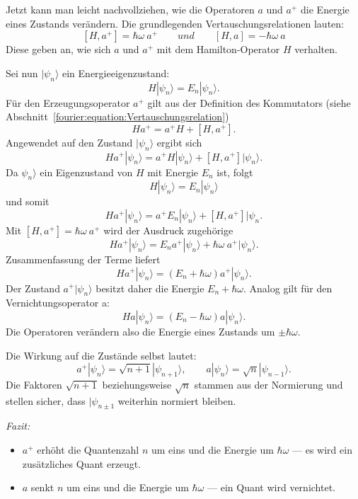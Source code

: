 			Jetzt kann man leicht nachvollziehen, wie die Operatoren $a$ und $a^+$ die Energie eines Zustands verändern.
			Die grundlegenden Vertauschungsrelationen lauten:
			\[
				[H, a^+] = \hbar\omega~a^+
				\qquad
				und
				\qquad
				[H, a] = -\hbar\omega~a
			\]
			Diese geben an, wie sich $a$ und $a^+$ mit dem Hamilton-Operator $H$ verhalten.

			Sei nun $|\psi_n\rangle$ ein Energieeigenzustand:
			\[
				H|\psi_n\rangle = E_n|\psi_n\rangle.
			\]
			Für den Erzeugungsoperator $a^+$ gilt aus der Definition des Kommutators (siehe Abschnitt~\ref{fourier:equation:Vertauschungsrelation})
			\[
				H a^+ = a^+ H + [H, a^+].
			\]
			Angewendet auf den Zustand $|\psi_n\rangle$ ergibt sich
			\[
				H a^+|\psi_n\rangle = a^+ H|\psi_n\rangle + [H, a^+]|\psi_n\rangle.
			\]
			Da $\psi_n\rangle$ ein Eigenzustand von $H$ mit Energie $E_n$ ist, folgt
			\[
				H|\psi_n\rangle = E_n|\psi_n\rangle
			\]
			und somit
			\[
				H a^+|\psi_n\rangle = a^+ E_n|\psi_n\rangle + [H, a^+]|\psi_n.
			\]
			Mit $[H, a^+] = \hbar\omega~a^+$ wird der Ausdruck zugehörige
			\[
				H a^+|\psi_n\rangle = E_n a^+|\psi_n\rangle + \hbar\omega~a^+|\psi_n\rangle.
			\]
			Zusammenfassung der Terme liefert
			\begin{equation}
				H a^+|\psi_n\rangle = (E_n + \hbar\omega)a^+|\psi_n\rangle.
			\end{equation}
			Der Zustand $a^+|\psi_n\rangle$ besitzt daher die Energie $E_n + \hbar\omega$.
			Analog gilt für den Vernichtungsoperator a:
			\begin{equation}
				H a |\psi_n\rangle = (E_n - \hbar\omega)a|\psi_n\rangle.
			\end{equation}
			Die Operatoren verändern also die Energie eines Zustands um $\pm\hbar\omega$.

			Die Wirkung auf die Zustände selbst lautet:
			\begin{equation}
				a^+|\psi_n\rangle = \sqrt{n+1}|\psi_{n+1}\rangle, \qquad a|\psi_n\rangle = \sqrt{n}|\psi_{n-1}\rangle.
			\end{equation}
			Die Faktoren $\sqrt{n+1}$ beziehungsweise $\sqrt{n}$ stammen aus der Normierung und stellen sicher, dass $|\psi_{n\pm 1}$ weiterhin normiert bleiben.

			\emph{Fazit:}
			\begin{itemize}
				\item $a^+$ erhöht die Quantenzahl $n$ um eins und die Energie um $\hbar\omega$ ---
				es wird ein zusätzliches Quant erzeugt.
				\item $a$ senkt $n$ um eins und die Energie um $\hbar\omega$ ---
				ein Quant wird vernichtet.
			\end{itemize}

